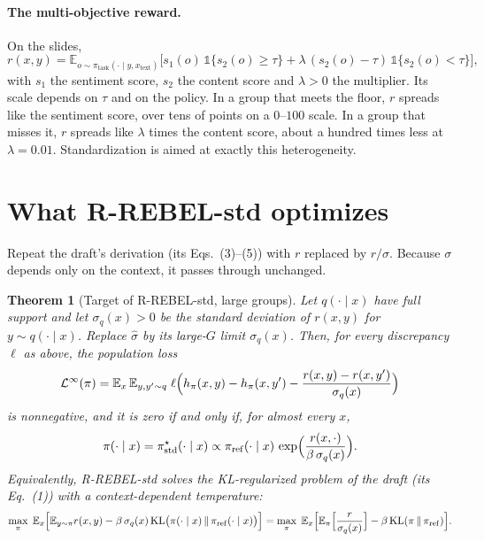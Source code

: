 \documentclass[11pt]{article}
\newtheorem{theorem}{Theorem}
\theoremstyle{definition}
\theoremstyle{remark}
\newcommand{\E}{\mathbb{E}}
\newcommand{\KL}{\mathrm{KL}}
\newcommand{\pref}{\pi_{\mathrm{ref}}}
\newcommand{\cL}{\mathcal{L}}
\newcommand{\1}{\mathbb{1}}
\newcommand{\rrs}{R-REBEL-std}
\begin{document}
\paragraph{The multi-objective reward.} On the slides,
\begin{equation}\label{eq:lagrangian}
  r(x,y)=\E_{o\sim\pi_{\mathrm{task}}(\cdot\mid y,x_{\mathrm{text}})}
  \bigl[s_1(o)\,\1\{s_2(o)\ge\tau\}+\lambda\,(s_2(o)-\tau)\,\1\{s_2(o)<\tau\}\bigr],
\end{equation}
with $s_1$ the sentiment score, $s_2$ the content score and $\lambda>0$ the
multiplier. Its scale depends on $\tau$ and on the policy. In a group that meets
the floor, $r$ spreads like the sentiment score, over tens of points on a
$0$--$100$ scale. In a group that misses it, $r$ spreads like $\lambda$ times the
content score, about a hundred times less at $\lambda=0.01$. Standardization is
aimed at exactly this heterogeneity.

\section{What \rrs{} optimizes}\label{sec:target}

Repeat the draft's derivation (its Eqs.~(3)--(5)) with $r$ replaced by $r/\sigma$.
Because $\sigma$ depends only on the context, it passes through unchanged.

\begin{theorem}[Target of \rrs{}, large groups]\label{thm:target}
Let $q(\cdot\mid x)$ have full support and let $\sigma_q(x)>0$ be the standard
deviation of $r(x,y)$ for $y\sim q(\cdot\mid x)$. Replace $\hat\sigma$ by its
large-$G$ limit $\sigma_q(x)$. Then, for every discrepancy $\ell$ as above, the
population loss
\[
  \cL^\infty(\pi)=\E_x\,\E_{y,y'\sim q}\;
  \ell\Bigl(h_\pi(x,y)-h_\pi(x,y')-\frac{r(x,y)-r(x,y')}{\sigma_q(x)}\Bigr)
\]
is nonnegative, and it is zero if and only if, for almost every $x$,
\begin{equation}\label{eq:target}
  \pi(\cdot\mid x)=\pi^\star_{\mathrm{std}}(\cdot\mid x)\propto
  \pref(\cdot\mid x)\,\exp\Bigl(\frac{r(x,\cdot)}{\beta\,\sigma_q(x)}\Bigr).
\end{equation}
Equivalently, \rrs{} solves the KL-regularized problem of the draft (its Eq.~(1))
with a \emph{context-dependent temperature}:
\[
  \max_\pi\;\E_x\Bigl[\E_{y\sim\pi}r(x,y)-\beta\,\sigma_q(x)\,\KL\bigl(\pi(\cdot\mid x)\,\|\,\pref(\cdot\mid x)\bigr)\Bigr]
  =\max_\pi\;\E_x\Bigl[\E_{\pi}\Bigl[\frac{r}{\sigma_q(x)}\Bigr]-\beta\,\KL(\pi\,\|\,\pref)\Bigr].
\]
\end{theorem}
\end{document}
